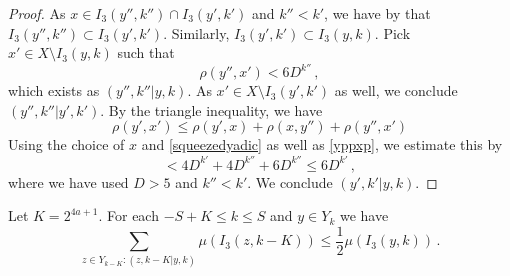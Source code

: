 \begin{proof}
    \leanok
    As $x\in I_3(y'',k'')\cap I_3(y',k')$ and $k''< k'$, we have by  that
    $I_3(y'',k'')\subset I_3(y',k')$. Similarly,
    $I_3(y',k')\subset I_3(y,k)$.
    Pick $x'\in X\setminus I_3(y,k)$ such that
    \begin{equation}\label{yppxp}
        \rho(y'',x')< 6D^{k''}\, ,
    \end{equation}
    which exists as $(y'',k''|y,k)$. As
    $x'\in X\setminus I_3(y',k')$ as well, we conclude
    $(y'',k''| y',k')$.
    By the triangle inequality, we have
    \begin{equation}
    \rho(y',x')\le \rho(y',x)+\rho(x,y'')+\rho(y'',x')
    \end{equation}
    Using the choice of $x$ and \eqref{squeezedyadic}
    as well as \eqref{yppxp}, we estimate this by
    \begin{equation}
    < 4D^{k'}+4D^{k''}+6D^{k''}\le 6D^{k'}\, ,
    \end{equation}
    where we have used $D>5$ and $k''<k'$.
    We conclude $(y',k'|y,k)$.
\end{proof}


\begin{lemma}
    \label{small-boundary}
    \leanok
    Let $K = 2^{4a+1}$. For each $-S+K\le k\le S$ and $y\in Y_k$ we have
      \begin{equation}
            \label{new-small-boundary}
            \sum_{z\in Y_{k-K}: (z,k-K|y,k)}\mu(I_3(z,k-K)) \le \frac 12 \mu(I_3(y,k))\,.
        \end{equation}
\end{lemma}


